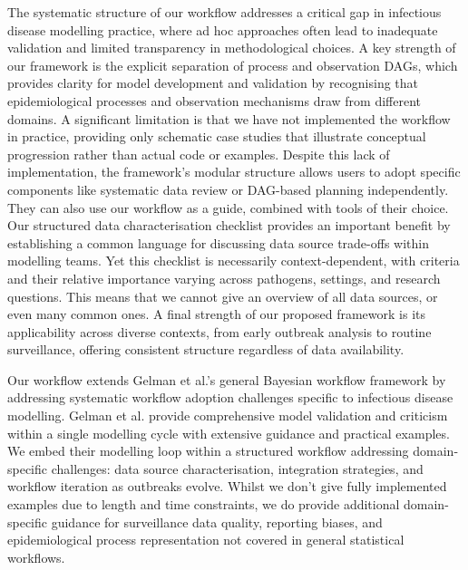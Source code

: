 \documentclass{article}
\begin{document}
The systematic structure of our workflow addresses a critical gap in infectious disease modelling practice, where ad hoc approaches often lead to inadequate validation and limited transparency in methodological choices.
A key strength of our framework is the explicit separation of process and observation DAGs, which provides clarity for model development and validation by recognising that epidemiological processes and observation mechanisms draw from different domains.
A significant limitation is that we have not implemented the workflow in practice, providing only schematic case studies that illustrate conceptual progression rather than actual code or examples.
Despite this lack of implementation, the framework's modular structure allows users to adopt specific components like systematic data review or DAG-based planning independently.
They can also use our workflow as a guide, combined with tools of their choice.
Our structured data characterisation checklist provides an important benefit by establishing a common language for discussing data source trade-offs within modelling teams.
Yet this checklist is necessarily context-dependent, with criteria and their relative importance varying across pathogens, settings, and research questions.
This means that we cannot give an overview of all data sources, or even many common ones.
A final strength of our proposed framework is its applicability across diverse contexts, from early outbreak analysis to routine surveillance, offering consistent structure regardless of data availability.


Our workflow extends Gelman et al.'s general Bayesian workflow framework \citep{gelman2020bayesian} by addressing systematic workflow adoption challenges specific to infectious disease modelling.
Gelman et al. provide comprehensive model validation and criticism within a single modelling cycle with extensive guidance and practical examples.
We embed their modelling loop within a structured workflow addressing domain-specific challenges: data source characterisation, integration strategies, and workflow iteration as outbreaks evolve. 
Whilst we don't give fully implemented examples due to length and time constraints, we do provide additional domain-specific guidance for surveillance data quality, reporting biases, and epidemiological process representation not covered in general statistical workflows.
 
\end{document}
